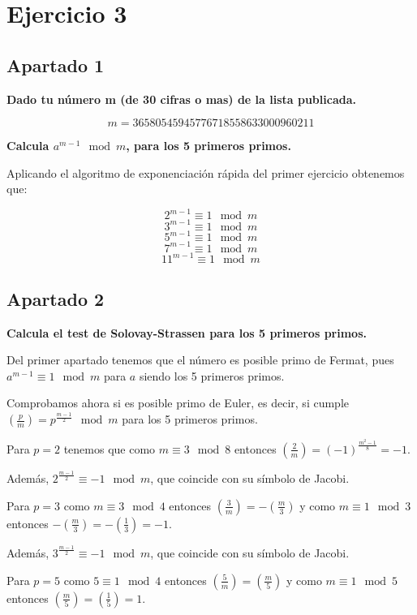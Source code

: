 \documentclass[a4paper]{article}
\title {\fbox{\Huge{\textbf{Ejercicio 3}}}}
\author {\fbox{Ana Buendía Ruiz-Azuaga}}
\begin{document}
\maketitle


\section{Ejercicio 3}
\subsection{Apartado 1}
\textbf{Dado tu número m (de 30 cifras o mas) de la lista publicada.}

$$m=36580545945776718558633000960211$$

\textbf{Calcula $a^{m-1} \mod m$, para los 5 primeros primos.}

Aplicando el algoritmo de exponenciación rápida del primer ejercicio obtenemos que:

$$2^{m-1}\equiv 1\mod m$$
$$3^{m-1}\equiv 1\mod m$$
$$5^{m-1}\equiv 1\mod m$$
$$7^{m-1}\equiv 1\mod m$$
$$11^{m-1}\equiv 1\mod m$$


\subsection{Apartado 2}
\textbf{Calcula el test de Solovay-Strassen para los 5 primeros primos.}

Del primer apartado tenemos que el número es posible primo de Fermat, pues $a^{m-1}\equiv 1\mod m$ para $a$ siendo los 5 primeros primos.

Comprobamos ahora si es posible primo de Euler, es decir, si cumple $\left( \frac{p}{m} \right)= p^{\frac{m-1}{2}}\mod m$ para los 5 primeros primos.

Para $p=2$ tenemos que como $m\equiv 3 \mod 8$ entonces $\left( \frac{2}{m}\right)=(-1)^{\frac{m^2-1}{8}}=-1$.

Además, $2^{\frac{m-1}{2}}\equiv -1\mod m$, que coincide con su símbolo de Jacobi.

Para $p=3$ como $m\equiv 3\mod 4$ entonces $\left( \frac{3}{m}\right)=-\left( \frac{m}{3}\right)$ y como $m\equiv 1\mod 3$ entonces $-\left( \frac{m}{3}\right)=-\left( \frac{1}{3}\right)=-1$.

Además, $3^{\frac{m-1}{2}}\equiv -1\mod m$, que coincide con su símbolo de Jacobi.

Para $p=5$ como $5\equiv 1\mod 4$ entonces $\left( \frac{5}{m}\right)=\left( \frac{m}{5}\right)$ y como $m\equiv 1\mod 5$ entonces $\left( \frac{m}{5}\right)=\left( \frac{1}{5}\right)=1$.
\end{document}
